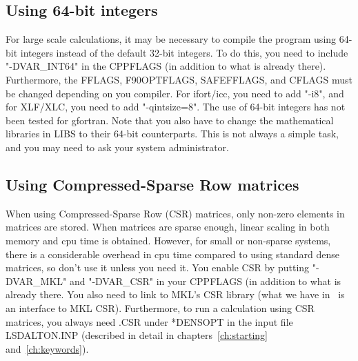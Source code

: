 \subsection{Using 64-bit integers}
For large scale calculations, it may be necessary to compile the program using 64-bit integers instead of the default 32-bit integers.
To do this, you need to include "-DVAR\_INT64" in the CPPFLAGS (in addition to what is already there). Furthermore, 
the FFLAGS, F90OPTFLAGS, SAFEFFLAGS, and CFLAGS must be changed depending on you compiler. For ifort/icc, you need to add "-i8",
and for XLF/XLC, you need to add "-qintsize=8". The use of 64-bit integers has not been tested for gfortran. Note that you also have
to change the mathematical libraries in LIBS to their 64-bit counterparts. This is not always a simple task, and you may need to ask your
system administrator. 

\subsection{Using Compressed-Sparse Row matrices}
When using Compressed-Sparse Row (CSR) matrices, only non-zero elements in matrices are stored. 
When matrices are sparse enough, linear scaling in both memory and cpu time is obtained. However, for
small or non-sparse systems, there is a considerable overhead in cpu time compared to 
using standard dense matrices, so don't use it unless you need it. You enable CSR by putting
"-DVAR\_MKL" and "-DVAR\_CSR" in your CPPFLAGS (in addition to what is already there. You also need to link
to MKL's CSR library (what we have in \lsdalton\ is an interface to MKL CSR). Furthermore, to run a calculation
using CSR matrices, you always need .CSR under *DENSOPT in the input file LSDALTON.INP (described in detail in
chapters~\ref{ch:starting} and~\ref{ch:keywords}).



